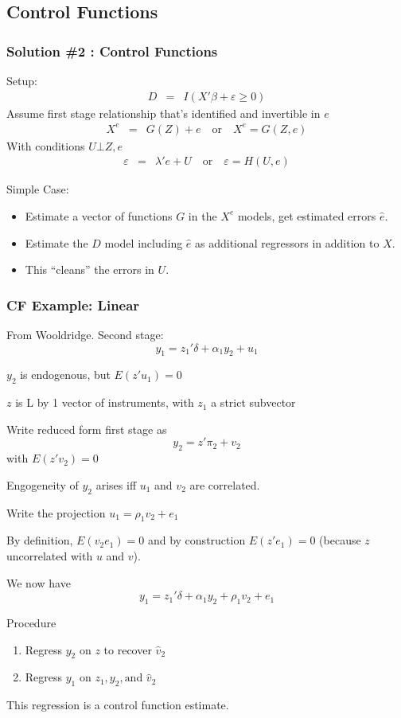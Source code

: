 \subsection{Control Functions}

       
\begin{frame}
\frametitle{Solution \#2 : Control Functions}
Setup: 
\begin{eqnarray*}
D &=& I ( X' \beta + \varepsilon \geq 0 ) 
\end{eqnarray*}
Assume first stage relationship that's identified and invertible in $e$
\begin{eqnarray*}
X^e &=& G(Z) +e  \quad \mbox{or}  \quad  X^e = G(Z,e)
\end{eqnarray*}
With conditions $ U \bot Z,e$
\begin{eqnarray*}
\varepsilon  &=&\lambda' e + U \quad \mbox{or}  \quad  \varepsilon = H(U,e) 
\end{eqnarray*}
       
Simple Case:
\begin{itemize}
\item Estimate a vector of functions $G$ in the $X^e$ models, get estimated errors $\hat{e}$.
\item Estimate the $D$ model including $\hat{e}$ as additional regressors in addition to $X$.
\item This ``cleans'' the errors in $U$.
\end{itemize}
\end{frame}

\begin{frame}[allowframebreaks]
       \frametitle{CF Example: Linear}
       From Wooldridge. Second stage: 
       $$y_1 = z_1'\delta + \alpha_1 y_2 + u_1$$ 

       $y_2$ is endogenous, but $E(z'u_1)=0$ 

       \medskip
       $z$ is L by 1 vector of instruments, with $z_1$ a strict subvector

       \medskip
       Write reduced form first stage as $$y_2 = z'\pi_2 + v_2$$ with $E(z'v_2)=0$

       \medskip
       Engogeneity of $y_2$ arises iff $u_1$ and $v_2$ are correlated.  

       \framebreak

       Write the projection $u_1 = \rho_1 v_2 + e_1$ 

       \medskip

       By definition, $E(v_2 e_1)=0$ and by construction $E(z'e_1)=0$ (because $z$ uncorrelated with $u$ and $v$). 

       \medskip

       We now have $$y_1 = z_1'\delta + \alpha_1 y_2 + \rho_1 v_2 + e_1$$

       Procedure
       \begin{enumerate}
              \item Regress $y_2$ on $z$ to recover $\hat v_2$ 
              \item Regress $y_1$ on $z_1, y_2, \mbox{and } \hat v_2$
       \end{enumerate}
       This regression is a \alert{control function} estimate. 
\end{frame}

